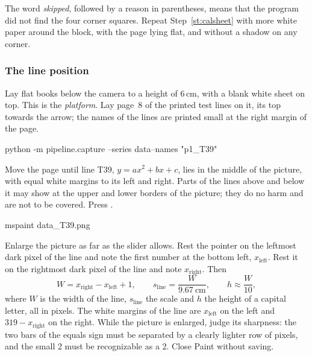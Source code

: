 \begin{iffail}
The word \emph{skipped}, followed by a reason in parentheses, means that the program did not
find the four corner squares. Repeat Step~\ref{st:calsheet} with more white paper around the
block, with the page lying flat, and without a shadow on any corner.
\end{iffail}

\subsubsection*{The line position}

\label{st:calline}
Lay flat books below the camera to a height of 6\,cm, with a blank white sheet on top. This is
the \emph{platform}. Lay page~8 of the printed test lines on it, its top towards the arrow; the
names of the lines are printed small at the right margin of the page.
\begin{ps}
python -m pipeline.capture --series data\raw\rig --names "p1_T39"
\end{ps}
Move the page until line T39, $y=ax^{2}+bx+c$, lies in the middle of the picture, with equal
white margins to its left and right. Parts of the lines above and below it may show at the
upper and lower borders of the picture; they do no harm and are not to be covered. Press
.


\label{st:measure}
\begin{ps}
mspaint data\raw\rig{}_T39.png
\end{ps}
Enlarge the picture as far as the slider allows. Rest the pointer on the leftmost dark pixel of
the line and note the first number at the bottom left, $x_{\text{left}}$. Rest it on the
rightmost dark pixel of the line and note $x_{\text{right}}$. Then
\[
  W = x_{\text{right}} - x_{\text{left}} + 1, \qquad
  s_{\text{line}} = \frac{W}{9.67\ \text{cm}}, \qquad
  h \approx \frac{W}{10} ,
\]
where $W$ is the width of the line, $s_{\text{line}}$ the scale and $h$ the height of a capital
letter, all in pixels. The white margins of the line are $x_{\text{left}}$ on the left and
$319 - x_{\text{right}}$ on the right. While the picture is enlarged, judge its sharpness: the
two bars of the equals sign must be separated by a clearly lighter row of pixels, and the small
2 must be recognizable as a 2. Close Paint without saving.

